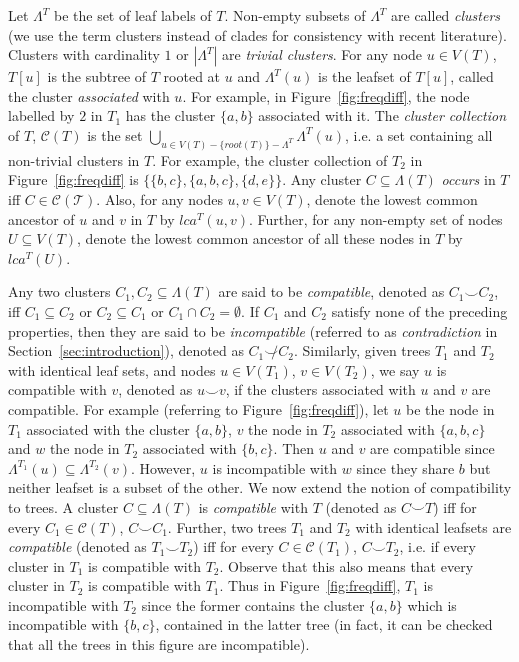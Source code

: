\documentclass{article}
\newcommand{\compatible}{\smile}
\newcommand{\leafset}{\Lambda}
\begin{document}
    Let $\leafset^T$ be the set of leaf labels of $T$. Non-empty subsets of $\leafset^T$ are called \textit{clusters} (we use the term clusters instead of clades for consistency with recent literature). Clusters with cardinality $1$ or $|\leafset^T|$ are \textit{trivial clusters}. For any node $u \in V(T)$, $T[u]$ is the subtree of $T$ rooted at $u$ and $\leafset^T(u)$ is the leafset of $T[u]$, called the cluster \textit{associated} with $u$. For example, in Figure~\ref{fig:freqdiff}, the node labelled by $2$ in $T_1$ has the cluster $\{a, b\}$ associated with it. The \textit{cluster collection} of $T$, $\mathcal{C}(T)$ is the set $\bigcup_{u \in V(T) - \{root(T)\} - \leafset^T} {\leafset^T(u)}$, i.e. a set containing all non-trivial clusters in $T$. For example, the cluster collection of $T_2$ in Figure~\ref{fig:freqdiff} is $\{\{b, c\}, \{a, b, c\}, \{d, e\}\}$. Any cluster $C \subseteq \leafset(T)$ \textit{occurs} in $T$ iff $C \in \mathcal{C(T)}$. Also, for any nodes $u, v \in V(T)$, denote the lowest common ancestor of $u$ and $v$ in $T$ by $lca^T(u, v)$. Further, for any non-empty set of nodes $U \subseteq V(T)$, denote the lowest common ancestor of all these nodes in $T$ by $lca^T(U)$.

    Any two clusters $C_1, C_2 \subseteq \leafset(T)$ are said to be \textit{compatible}, denoted as $C_1 \compatible C_2$, iff $C_1 \subseteq C_2$ or $C_2 \subseteq C_1$ or $C_1 \cap C_2 = \emptyset$. If $C_1$ and $C_2$ satisfy none of the preceding properties, then they are said to be \textit{incompatible} (referred to as \textit{contradiction} in Section~\ref{sec:introduction}), denoted as $C_1 \not\compatible C_2$. Similarly, given trees $T_1$ and $T_2$ with identical leaf sets, and nodes $u \in V(T_1)$, $v \in V(T_2)$, we say $u$ is compatible with $v$, denoted as $u \compatible v$, if the clusters associated with $u$ and $v$ are compatible. For example (referring to Figure~\ref{fig:freqdiff}), let $u$ be the node in $T_1$ associated with the cluster $\{a, b\}$, $v$ the node in $T_2$ associated with $\{a, b, c\}$ and $w$ the node in $T_2$ associated with $\{b, c\}$. Then $u$ and $v$ are compatible since $\leafset^{T_1}(u) \subseteq \leafset^{T_2}(v)$. However, $u$ is incompatible with $w$ since they share $b$ but neither leafset is a subset of the other. We now extend the notion of compatibility to trees. A cluster $C \subseteq \leafset(T)$ is \textit{compatible} with $T$ (denoted as $C \compatible T$) iff for every $C_1 \in \mathcal{C}(T)$, $C \compatible C_1$. Further, two trees $T_1$ and $T_2$ with identical leafsets are \textit{compatible} (denoted as $T_1 \compatible T_2$) iff for every $C \in \mathcal{C}(T_1)$, $C \compatible T_2$, i.e. if every cluster in $T_1$ is compatible with $T_2$. Observe that this also means that every cluster in $T_2$ is compatible with $T_1$. Thus in Figure~\ref{fig:freqdiff}, $T_1$ is incompatible with $T_2$ since the former contains the cluster $\{a, b\}$ which is incompatible with $\{b, c\}$, contained in the latter tree (in fact, it can be checked that all the trees in this figure are incompatible).
\end{document}
